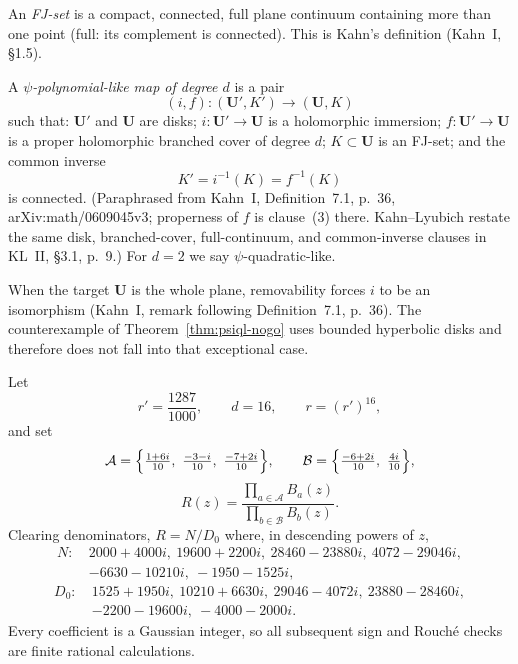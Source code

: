 \begin{definition}[FJ-set]\label{def:fj}
An \emph{FJ-set} is a compact, connected, full plane continuum containing more than one point (full: its complement is connected). This is Kahn's definition (Kahn~I, \S1.5).
\end{definition}

\begin{definition}\label{def:psiql}
A \emph{\(\psi\)-polynomial-like map of degree \(d\)} is a pair
\[ (i,f):(\mathbf U',K')\longrightarrow(\mathbf U,K) \]
such that: \(\mathbf U'\) and \(\mathbf U\) are disks; \(i:\mathbf U'\to\mathbf U\) is a holomorphic immersion; \(f:\mathbf U'\to\mathbf U\) is a proper holomorphic branched cover of degree \(d\); \(K\subset\mathbf U\) is an FJ-set; and the common inverse
\[ K'=i^{-1}(K)=f^{-1}(K) \]
is connected. (Paraphrased from Kahn~I, Definition~7.1, p.~36, arXiv:math/0609045v3; properness of \(f\) is clause~(3) there.  Kahn--Lyubich restate the same disk, branched-cover, full-continuum, and common-inverse clauses in KL~II, \S3.1, p.~9.) For \(d=2\) we say \(\psi\)-quadratic-like.
\end{definition}

\begin{remark}\label{rem:plane-case}
When the target \(\mathbf U\) is the whole plane, removability forces \(i\) to be an isomorphism (Kahn~I, remark following Definition~7.1, p.~36). The counterexample of Theorem~\ref{thm:psiql-nogo} uses bounded hyperbolic disks and therefore does not fall into that exceptional case.
\end{remark}

\begin{definition}\label{def:blaschke-quotient}
Let
\[ r'=\frac{1287}{1000},\qquad d=16,\qquad r=(r')^{16}, \]
and set
\[ \mathcal A=\Bigl\{\tfrac{1+6i}{10},\ \tfrac{-3-i}{10},\ \tfrac{-7+2i}{10}\Bigr\},\qquad \mathcal B=\Bigl\{\tfrac{-6+2i}{10},\ \tfrac{4i}{10}\Bigr\}, \]
\[ R(z)=\frac{\prod_{a\in\mathcal A}B_a(z)}{\prod_{b\in\mathcal B}B_b(z)}. \tag{A.1} \]
Clearing denominators, \(R=N/D_0\) where, in descending powers of \(z\),
\[\begin{aligned} N:\ & 2000+4000i,\ 19600+2200i,\ 28460-23880i,\ 4072-29046i,\\ &-6630-10210i,\ -1950-1525i, \end{aligned}\tag{A.2}\]
\[\begin{aligned} D_0:\ & 1525+1950i,\ 10210+6630i,\ 29046-4072i,\ 23880-28460i,\\ &-2200-19600i,\ -4000-2000i. \end{aligned}\tag{A.3}\]
Every coefficient is a Gaussian integer, so all subsequent sign and Rouch\'e checks are finite rational calculations.
\end{definition}